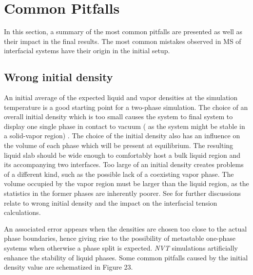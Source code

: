 \documentclass[9pt,bestpractices]{livecoms}
\begin{document}
\section{Common Pitfalls}

In this section, a summary of the most common pitfalls are presented as well as
their impact in the final results. The most common mistakes observed in MS of
interfacial systems have their origin in the initial setup. 

\subsection{Wrong initial density}

An initial average of the expected liquid and vapor densities at the simulation
temperature is a good starting point for a two-phase simulation. The choice of
an overall initial density which is too small causes the system to final system
to display one single phase in contact to vacuum ( as the system might be
stable in a solid-vapor region) . The choice of the initial density also has an
influence on the volume of each phase which will be present at equilibrium. The
resulting liquid slab should be wide enough to comfortably host a bulk liquid
region and its accompanying two interfaces. Too large of an initial density
creates problems of a different kind, such as the possible lack of a coexisting
vapor phase. The volume occupied by the vapor region must be larger than the
liquid region, as the statistics in the former phases are inherently poorer.
See \citet{holcomb1993} for further discussions relate
to wrong initial density and the impact on the interfacial tension
calculations.

An associated error appears when the densities are chosen too close to the
actual phase boundaries, hence giving rise to the possibility of metastable
one-phase systems when otherwise a phase split is expected. \textit{NVT}
simulations artificially enhance the stability of liquid phases. Some common
pitfalls caused by the initial density value are schematized in Figure 23.
\end{document}
